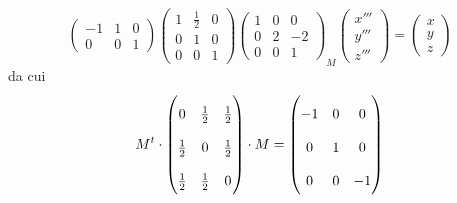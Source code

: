 \documentclass{article}     %
\begin{document}
\begin{ex}
\[{\begin{pmatrix}
        -1&1&0\\
        0&0&1
    \end{pmatrix}
    \begin{pmatrix}
        1&\frac{1}{2}&0\\
        0&1&0\\
        0&0&1
    \end{pmatrix}
    \begin{pmatrix}
        1&0&0\\
        0&2&-2\\
        0&0&1
    \end{pmatrix}}_{M}\begin{pmatrix}
        x'''\\y'''\\z'''
    \end{pmatrix}= \begin{pmatrix}
        x\\y\\z
    \end{pmatrix}\]
    da cui
    \[{\renewcommand{\arraystretch}{2}
        M^t\cdot\begin{pmatrix}
        0&\frac{1}{2}&\frac{1}{2}\\
        \frac{1}{2}&0&\frac{1}{2}\\
        \frac{1}{2}&\frac{1}{2}&0
    \end{pmatrix}\cdot M}=\begin{pmatrix}-1&0&0\\0&1&0\\0&0&-1\end{pmatrix}\]
\end{ex}
\end{document}
